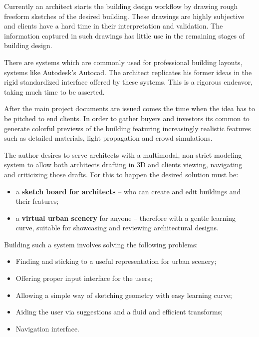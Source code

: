 Currently an architect starts the building design workflow by drawing rough
freeform sketches of the desired building. These drawings are highly subjective
and clients have a hard time in their interpretation and validation.
The information captured in such drawings has little use in the remaining stages
of building design.


There are systems which are commonly used for professional building layouts, systems
like Autodesk's Autocad. The architect replicates his former ideas in the rigid
standardized interface offered by these systems. This is a rigorous endeavor,
taking much time to be asserted.

After the main project documents are issued comes the time when the idea has to
be pitched to end clients. In order to gather buyers and investors its common to
generate colorful previews of the building featuring increasingly realistic
features such as detailed materials, light propagation and crowd simulations.

The author desires to serve architects with a multimodal, non strict modeling
system to allow both architects drafting in 3D and clients viewing, navigating
and criticizing those drafts. For this to happen the desired solution must be:


\begin{itemize}
	\item a {\bf sketch board for architects} -- who can create and edit buildings and their features;
	\item a {\bf virtual urban scenery} for anyone -- therefore with a gentle learning curve, suitable for showcasing and reviewing architectural designs.
\end{itemize}

Building such a system involves solving the following problems:
\begin{itemize}
	\item Finding and sticking to a useful representation for urban scenery;
	\item Offering proper input interface for the users;
	\item Allowing a simple way of sketching geometry with easy learning curve;
	\item Aiding the user via suggestions and a fluid and efficient transforms;
	\item Navigation interface.
\end{itemize}


